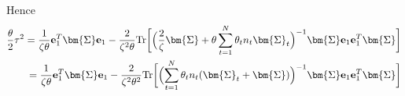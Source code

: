 \documentclass[final]{l4dc2026}
\newcommand{\bSigma}{\bm{\Sigma}}
\newcommand{\be}{\mathbf{e}}
\newcommand{\bh}{\mathbf{h}}
\newcommand{\tr}{\text{Tr}}
\begin{document}
Hence
\begin{align}\label{eq: tau}
    \frac{\theta}{2} \tau^2 = \frac{1}{\zeta \theta} \be_1^T \bSigma \be_1  - \frac{2}{\zeta^2 \theta } \tr \biggl[\Bigl(\frac{2}{\zeta}\bSigma+\theta\sum_{t=1}^N \theta_t n_t \bSigma_t \Bigr)^{-1}\bSigma \be_1 \be_1^T \bSigma \biggr] \nonumber \\
    =  \frac{1}{\zeta \theta} \be_1^T \bSigma \be_1 - \frac{2}{\zeta^2 \theta^2} \tr \biggl[ \Bigl(\sum_{t=1}^N \theta_t n_t (\bSigma_t + \bSigma) \Bigr)^{-1}\bSigma \be_1 \be_1^T \bSigma \biggr]
\end{align}
\end{document}
